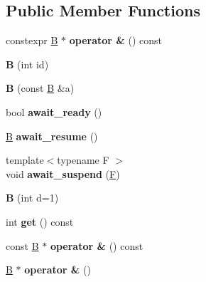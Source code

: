 \subsection*{Public Member Functions}
\begin{DoxyCompactItemize}
\item 
\mbox{\label{struct_b_a9c20104412ffa0166e2223ac6345c0d0}} 
constexpr \mbox{\hyperlink{struct_b}{B}} $\ast$ {\bfseries operator \&} () const
\item 
\mbox{\label{struct_b_aeceef31cd1d348e653c24a3bcac3dc5a}} 
{\bfseries B} (int id)
\item 
\mbox{\label{struct_b_a351a753f7357813287a32127157473b5}} 
{\bfseries B} (const \mbox{\hyperlink{struct_b}{B}} \&a)
\item 
\mbox{\label{struct_b_a2388251ae3babc404f9845c7647180e9}} 
bool {\bfseries await\+\_\+ready} ()
\item 
\mbox{\label{struct_b_adc5564e68de4379d4d0d49d1243a6cb9}} 
\mbox{\hyperlink{struct_b}{B}} {\bfseries await\+\_\+resume} ()
\item 
\mbox{\label{struct_b_a048fe606464f86f2baa74387407433a6}} 
{\footnotesize template$<$typename F $>$ }\\void {\bfseries await\+\_\+suspend} (\mbox{\hyperlink{struct_f}{F}})
\item 
\mbox{\label{struct_b_aa42e20cbcc679a9199f39f2451c7e4a8}} 
{\bfseries B} (int d=1)
\item 
\mbox{\label{struct_b_a8010f8634839a4f79e94f5c6224d15dd}} 
int {\bfseries get} () const
\item 
\mbox{\label{struct_b_a344fab102bea0c8e267d711b1e9df707}} 
const \mbox{\hyperlink{struct_b}{B}} $\ast$ {\bfseries operator \&} () const
\item 
\mbox{\label{struct_b_a9fcc9d73fa95dd97bb88814bb990c7bb}} 
\mbox{\hyperlink{struct_b}{B}} $\ast$ {\bfseries operator \&} ()
\item 
\mbox{\label{struct_b_a9c38e0aaea220d657a5985086fe3759c}} 

\end{DoxyCompactItemize}
